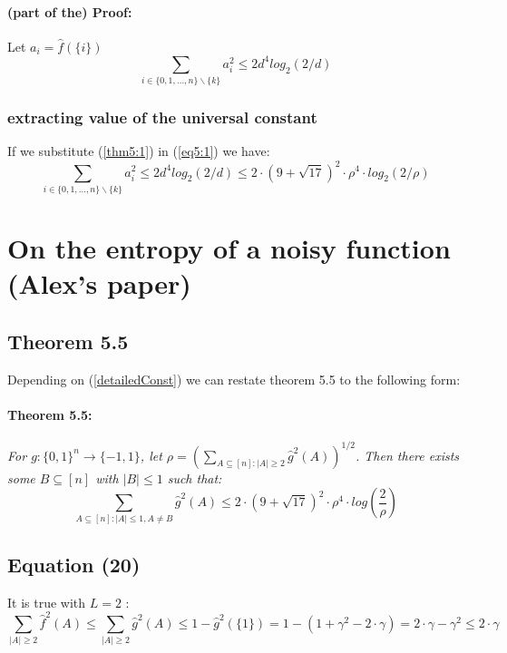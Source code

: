 \documentclass{article}
\begin{document}
				\paragraph{(part of the) Proof:}
					Let $a_i = \hat{f}(\{i\})$
					\begin{equation} \label{eq5:1}
						\sum_{i \in \{0,1, \dots , n\} \backslash \{k\}} a_i^2 \leq 2d^4log_2(2/d)
					\end{equation}		
			\subsubsection{extracting value of the universal constant}
				If we substitute (\ref{thm5:1}) in (\ref{eq5:1}) we have:
				\begin{equation} \label{detailedConst}
					\sum_{i \in \{0,1, \dots , n\} \backslash \{k\}} a_i^2 
					\leq 2d^4log_2(2/d) 
					\leq 2 \cdot \left( 9 + \sqrt{17} \right) ^ 2 \cdot \rho^4 \cdot log_2(2/\rho)
				\end{equation}
	
	\section{On the entropy of a noisy function (Alex's paper)}
		\subsection{Theorem 5.5}
			Depending on (\ref{detailedConst}) we can restate theorem 5.5 to the following form:
			\paragraph{Theorem 5.5:} \textit{For $ g: \{0,1\}^n \rightarrow \{-1,1\}$, let $\rho = \left( \sum_{A \subseteq [n]: |A| \geq 2} \hat{g}^2(A) \right) ^ {1/2} $. Then there exists some $ B \subseteq [n]$ with $|B| \leq 1$ such that:}
				$$  \sum_{A \subseteq [n]: |A| \leq 1, A \neq B} \hat{g}^2 (A) \leq 2 \cdot \left( 9 + \sqrt{17} \right)^2 \cdot \rho^4 \cdot log \left( \frac{2}{\rho} \right) $$
	
		\subsection{Equation (20)}
			It is true with $L=2$ :
			\begin{equation} \label{eq:20}
				\sum_{|A| \geq 2} \hat{f}^2 (A) 
				\leq \sum_{|A| \geq 2} \hat{g}^2 (A) 
				\leq 1 - \hat{g}^2(\{1\}) = 1 - \left( 1 + \gamma^2 - 2 \cdot \gamma \right) = 2 \cdot \gamma - \gamma^2 
				\leq 2 \cdot \gamma
			\end{equation}
	
\end{document}
